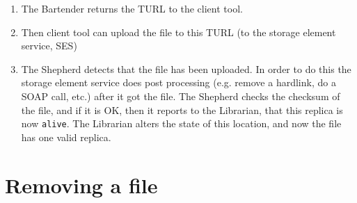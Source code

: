 \documentclass{book}
\begin{document}
\begin{enumerate}
    \item The Bartender returns the TURL to the client tool.
    \item Then client tool can upload the file to this TURL (to the storage element service, SES)
    \item The Shepherd detects that the file has been uploaded. In order to do this the storage element service does post processing (e.g. remove a hardlink, do a SOAP call, etc.) after it got the file. The Shepherd checks the checksum of the file, and if it is OK, then it reports to the Librarian, that this replica is now \verb#alive#. The Librarian alters the state of this location, and now the file has one valid replica. 
\end{enumerate}


\section{Removing a file} %
\label{sec:removing_a_file}
\end{document}
